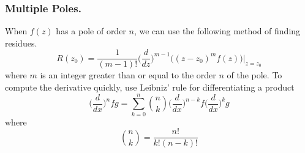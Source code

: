 \documentclass[../../../main.tex]{subfiles}
\begin{document}
\subsubsection{Multiple Poles.} When $f (z)$ has a pole of order $n$, we can use the following
method of finding residues.
\begin{equation*}
    R(z_0)=\frac{1}{(m-1)!}\biggl(\frac{d}{dz}\biggr)^{m-1}\biggl((z-z_0)^mf(z)\biggr)\bigg|_{z=z_0}
\end{equation*}
where $m$ is an integer greater than or equal to the order $n$ of the pole. To compute the derivative quickly, use Leibniz’ rule for differentiating a product
\begin{equation*}
    \biggl(\frac{d}{dx}\biggr)^{n}fg=\sum_{k=0}^n {n \choose k}\biggl(\frac{d}{dx}\biggr)^{n-k} f \biggl(\frac{d}{dx}\biggr)^{k}g
\end{equation*}
where
\begin{equation*}
    {n \choose k}={\frac{n!}{k! (n-k)!}}
\end{equation*}
\end{document}
